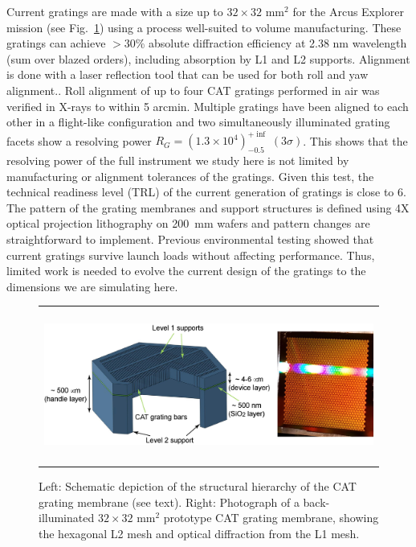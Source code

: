 \documentclass[12pt]{spieman}  %
\begin{document}
\begin{spacing}{1}
Current gratings are made with a size up to $32\times32$ mm$^2$ for the Arcus Explorer mission\cite{doi:10.1117/12.2272818} (see Fig.~\ref{fig:cell}) using a process well-suited to volume manufacturing.  These gratings can achieve $> 30$\% absolute diffraction efficiency at 2.38 nm wavelength (sum over blazed orders), including absorption by L1 and L2 supports\cite{doi:10.1117/12.2314180}. Alignment is done with a laser reflection tool that can be used for both roll and yaw alignment.\cite{doi:10.1117/12.2274206}. Roll alignment of up to four CAT gratings performed in air was verified in X-rays to within 5 arcmin\cite{doi:10.1117/12.2273000,doi:10.1117/12.2314180}. Multiple gratings have been aligned to each other in a flight-like configuration and two simultaneously illuminated grating facets show a resolving power $R_G=(1.3\times10^4)^{+\inf}_{-0.5}\;(3\sigma)$\cite{2022arXiv220609013H}. This shows that the resolving power of the full instrument we study here is not limited by manufacturing or alignment tolerances of the gratings. Given this test, the technical readiness level (TRL) of the current generation of gratings is close to 6. The pattern of the grating membranes and support structures is defined using 4X optical projection lithography on 200~mm wafers and pattern changes are straightforward to implement. Previous environmental testing showed that current gratings survive launch loads without affecting performance\cite{doi:10.1117/12.2273000}. Thus, limited work is needed to evolve the current design of the gratings to the dimensions we are simulating here.

\begin{figure} [ht]
\begin{center}
\begin{tabular}{c} %
\includegraphics[height=5cm]{unitcell+pic.jpg}
\end{tabular}
\end{center}
\caption {\label{fig:cell}
Left: Schematic depiction of the structural hierarchy of the CAT grating membrane (see text). Right: Photograph of a back-illuminated $32\times32$ mm$^2$ prototype CAT grating membrane, showing the hexagonal L2 mesh and optical diffraction from the L1 mesh.
}
\end{figure}



\end{spacing}
\end{document}
